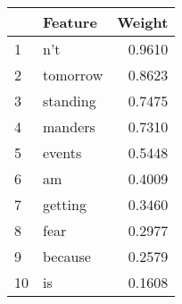 \begin{tabular}{llr}
\toprule
{} &   Feature &  Weight \\
\midrule
1  &       n't &  0.9610 \\
2  &  tomorrow &  0.8623 \\
3  &  standing &  0.7475 \\
4  &   manders &  0.7310 \\
5  &    events &  0.5448 \\
6  &        am &  0.4009 \\
7  &   getting &  0.3460 \\
8  &      fear &  0.2977 \\
9  &   because &  0.2579 \\
10 &        is &  0.1608 \\
\bottomrule
\end{tabular}
